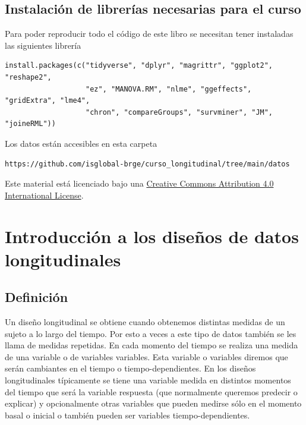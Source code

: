 \documentclass[
]{book}
\begin{document}
\hypertarget{instalaciuxf3n-de-libreruxedas-necesarias-para-el-curso}{%
\section{Instalación de librerías necesarias para el curso}\label{instalaciuxf3n-de-libreruxedas-necesarias-para-el-curso}}

Para poder reproducir todo el código de este libro se necesitan tener instaladas las siguientes librería

\begin{verbatim}
install.packages(c("tidyverse", "dplyr", "magrittr", "ggplot2", "reshape2",
                   "ez", "MANOVA.RM", "nlme", "ggeffects", "gridExtra", "lme4", 
                   "chron", "compareGroups", "survminer", "JM", "joineRML"))
\end{verbatim}

Los datos están accesibles en esta carpeta

\begin{verbatim}
https://github.com/isglobal-brge/curso_longitudinal/tree/main/datos
\end{verbatim}

Este material está licenciado bajo una \href{https://creativecommons.org/licenses/by/4.0/}{Creative Commons Attribution 4.0 International License}.

\hypertarget{intro}{%
\chapter{Introducción a los diseños de datos longitudinales}\label{intro}}

\hypertarget{definiciuxf3n}{%
\section{Definición}\label{definiciuxf3n}}

Un diseño longitudinal se obtiene cuando obtenemos distintas medidas de un sujeto a lo largo del tiempo. Por esto a veces a este tipo de datos también se les llama de medidas repetidas. En cada momento del tiempo se realiza una medida de una variable o de variables variables. Esta variable o variables diremos que serán cambiantes en el tiempo o tiempo-dependientes. En los diseños longitudinales típicamente se tiene una variable medida en distintos momentos del tiempo que será la variable respuesta (que normalmente queremos predecir o explicar) y opcionalmente otras variables que pueden medirse sólo en el momento basal o inicial o también pueden ser variables tiempo-dependientes.
\end{document}
